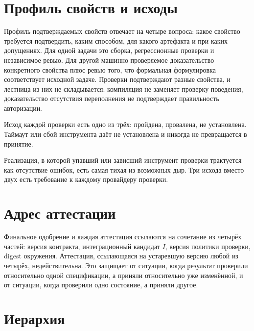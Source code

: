 \section{Профиль свойств и исходы}

Профиль подтверждаемых свойств отвечает на четыре вопроса: какое свойство требуется подтвердить, каким способом, для какого артефакта и при каких допущениях. Для одной задачи это сборка, регрессионные проверки и независимое ревью. Для другой машинно проверяемое доказательство конкретного свойства плюс ревью того, что формальная формулировка соответствует исходной задаче. Проверки подтверждают разные свойства, и лестница из них не складывается: компиляция не заменяет проверку поведения, доказательство отсутствия переполнения не подтверждает правильность авторизации.

Исход каждой проверки есть одно из трёх: пройдена, провалена, не установлена. Таймаут или сбой инструмента даёт не установлена и никогда не превращается в принятие.

\begin{warnbox}
Реализация, в которой упавший или зависший инструмент проверки трактуется как отсутствие ошибок, есть самая тихая из возможных дыр. Три исхода вместо двух есть требование к каждому провайдеру проверки.
\end{warnbox}

\section{Адрес аттестации}

Финальное одобрение и каждая аттестация ссылаются на сочетание из четырёх частей: версия контракта, интеграционный кандидат $I$, версия политики проверки, digest окружения. Аттестация, ссылающаяся на устаревшую версию любой из четырёх, недействительна. Это защищает от ситуации, когда результат проверили относительно одной спецификации, а приняли относительно уже изменённой, и от ситуации, когда проверили одно состояние, а приняли другое.

\section{Иерархия}

